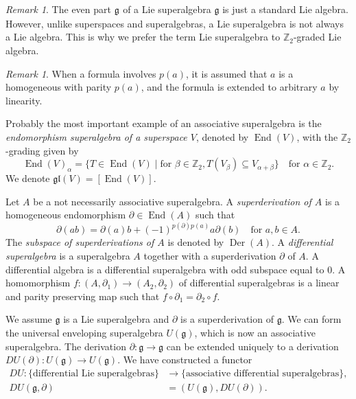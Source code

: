 \documentclass[a4paper, 12pt, reqno]{amsart}
\theoremstyle{remark}
\newtheorem{remark}[theorem]{Remark}
\DeclareMathOperator{\End}{End}
\DeclareMathOperator{\zero}{\overline{0}}
\DeclareMathOperator{\Der}{Der}
\begin{document}
\begin{remark}
  \label{rmk:2}
  The even part $\mathfrak{g}_{\zero}$ of a Lie superalgebra $\mathfrak{g}$ is just a standard Lie algebra.
  However, unlike superspaces and superalgebras, a Lie superalgebra is not always a Lie algebra.
  This is why we prefer the term Lie superalgebra to $\mathbb{Z}_2$-graded Lie algebra.
\end{remark}

\begin{remark}
  \label{rmk:3}
  When a formula involves $p(a)$, it is assumed that $a$ is a homogeneous with parity $p(a)$, and the formula is extended to arbitrary $a$ by linearity.
\end{remark}

Probably the most important example of an associative superalgebra is the \emph{endomorphism superalgebra of a superspace $V$}, denoted by $\End(V)$, with the $\mathbb{Z}_2$-grading given by
\begin{equation*}
  \End(V)_{\alpha} = \{T \in \End(V) \mid \text{for $\beta \in \mathbb{Z}_2, T(V_{\beta}) \subseteq V_{\alpha + \beta}$}\} \quad \text{for $\alpha \in \mathbb{Z}_2$}.
\end{equation*}
We denote $\mathfrak{gl}(V) = [\End(V)]$.

Let $A$ be a not necessarily associative superalgebra.
A \emph{superderivation of $A$} is a homogeneous endomorphism $\partial \in \End(A)$ such that
\begin{equation*}
  \partial(ab) = \partial(a)b + (-1)^{p(\partial)p(a)}a\partial(b) \quad \text{for $a, b \in A$}.
\end{equation*}
The \emph{subspace of superderivations of $A$} is denoted by $\Der(A)$.
A \emph{differential superalgebra} is a superalgebra $A$ together with a superderivation $\partial$ of $A$.
A differential algebra is a differential superalgebra with odd subspace equal to $0$.
A homomorphism $f: (A, \partial_1) \to (A_2, \partial_2)$ of differential superalgebras is a linear and parity preserving map such that $f\circ\partial_1 = \partial_2\circ f$.

We assume $\mathfrak{g}$ is a Lie superalgebra and $\partial$ is a superderivation of $\mathfrak{g}$.
We can form the universal enveloping superalgebra $U(\mathfrak{g})$, which is now an associative superalgebra.
The derivation $\partial: \mathfrak{g} \to \mathfrak{g}$ can be extended uniquely to a derivation $DU(\partial): U(\mathfrak{g}) \to U(\mathfrak{g})$.
We have constructed a functor
\begin{align*}
  DU: \{\text{differential Lie superalgebras}\} &\to \{\text{associative differential superalgebras}\}, \\
  DU(\mathfrak{g}, \partial) &= (U(\mathfrak{g}), DU(\partial)).
\end{align*}
\end{document}
